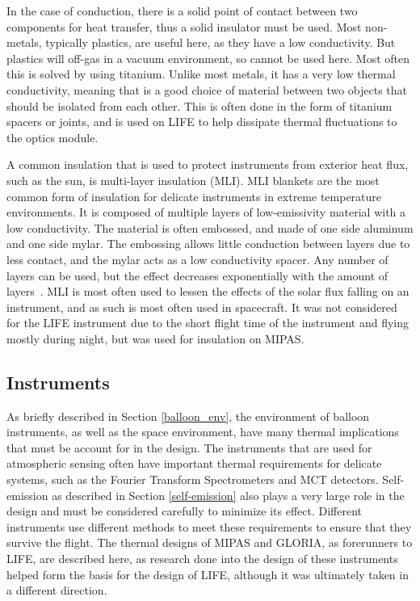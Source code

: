 In the case of conduction, there is a solid point of contact between two components for heat transfer, thus a solid insulator must be used. Most non-metals, typically plastics, are useful here, as they have a low conductivity. But plastics will off-gas in a vacuum environment, so cannot be used here. Most often this is solved by using titanium. Unlike most metals, it has a very low thermal conductivity, meaning that is a good choice of material between two objects that should be isolated from each other. This is often done in the form of titanium spacers or joints, and is used on LIFE to help dissipate thermal fluctuations to the optics module.

A common insulation that is used to protect instruments from exterior heat flux, such as the sun, is multi-layer insulation (MLI). MLI blankets are the most common form of insulation for delicate instruments in extreme temperature environments. It is composed of multiple layers of low-emissivity material with a low conductivity. The material is often embossed, and made of one side aluminum and one side mylar. The embossing allows little conduction between layers due to less contact, and the mylar acts as a low conductivity spacer. Any number of layers can be used, but the effect decreases exponentially with the amount of layers~\citep{SMAD}. MLI is most often used to lessen the effects of the solar flux falling on an instrument, and as such is most often used in spacecraft. It was not considered for the LIFE instrument due to the short flight time of the instrument and flying mostly during night, but was used for insulation on MIPAS.

\subsection{Instruments} \label{GLORIA_MIPAS_thermal}
As briefly described in Section \ref{balloon_env}, the environment of balloon instruments, as well as the space environment, have many thermal implications that must be account for in the design. The instruments that are used for atmospheric sensing often have important thermal requirements for delicate systems, such as the Fourier Transform Spectrometers and MCT detectors. Self-emission as described in Section \ref{self-emission} also plays a very large role in the design and must be considered carefully to minimize its effect. Different instruments use different methods to meet these requirements to ensure that they survive the flight. The thermal designs of MIPAS and GLORIA, as forerunners to LIFE, are described here, as research done into the design of these instruments helped form the basis for the design of LIFE, although it was ultimately taken in a different direction.

